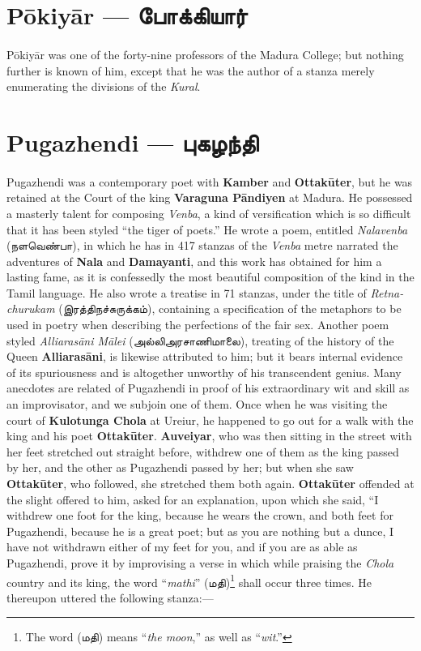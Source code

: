 \documentclass{article}
\newcommand{\TamilText}[1]{\texttamil{#1}}
\newcommand{\TamilBold}[1]{\texttamil{\textbf{#1}}}
\newcommand{\tam}[1]{\TamilText{#1}}
\newcommand{\tambold}[1]{\TamilBold{#1}}
\begin{document}
\section{P\={o}kiy\={a}r --- \tambold{போக்கியார்}}
\paragraph{}
P\={o}kiy\={a}r was one of the forty-nine professors of the Madura College; but nothing further is known of him, except that he was the author of a stanza merely enumerating the divisions of the \emph{Kural}.

\section{Pugazhendi --- \tambold{புகழந்தி}}
\paragraph{}
Pugazhendi was a contemporary poet with \textbf{Kamber} and \textbf{Ottak\={u}ter}, but he was retained at the Court of the king \textbf{Varaguna P\={a}ndiyen} at Madura. He possessed a masterly talent for composing \emph{Venba}, a kind of versification which is so difficult that it has been styled ``the tiger of poets.'' He wrote a poem, entitled \emph{Nalavenba} (\tam{நளவெண்பா}), in which he has in 417 stanzas of the \emph{Venba} metre narrated the adventures of \textbf{Nala} and \textbf{Damayanti}, and this work has obtained for him a lasting fame, as it is confessedly the most beautiful composition of the kind in the Tamil language. He also wrote a treatise in 71 stanzas, under the title of \emph{Retna-churukam} (\tam{இரத்திநச்சுருக்கம்}), containing a specification of the metaphors to be used in poetry when describing the perfections of the fair sex. Another poem styled \emph{Alliaras\={a}ni M\={a}lei} (\tam{அல்லிஅரசாணிமாலை}), treating of the history of the Queen \textbf{Alliaras\={a}ni}, is likewise attributed to him; but it bears internal evidence of its spuriousness and is altogether unworthy of his transcendent genius. Many anecdotes are related of Pugazhendi in proof of his extraordinary wit and skill as an improvisator, and we subjoin one of them. Once when he was visiting the court of \textbf{Kulotunga Chola} at Ureiur, he happened to go out for a walk with the king and his poet \textbf{Ottak\={u}ter}. \textbf{Auveiyar}, who was then sitting in the street with her feet stretched out straight before, withdrew one of them as the king passed by her, and the other as Pugazhendi passed by her; but when she saw \textbf{Ottak\={u}ter}, who followed, she stretched them both again. \textbf{Ottak\={u}ter} offended at the slight offered to him, asked for an explanation, upon which she said, ``I withdrew one foot for the king, because he wears the crown, and both feet for Pugazhendi, because he is a great poet; but as you are nothing but a dunce, I have not withdrawn either of my feet for you, and if you are as able as Pugazhendi, prove it by improvising a verse in which while praising the \emph{Chola} country and its king, the word ``\emph{mathi}'' (\tam{மதி})\footnote{The word (\tam{மதி}) means ``\emph{the moon},'' as well as ``\emph{wit}.''} shall occur three times. He thereupon uttered the following stanza:---
\end{document}
